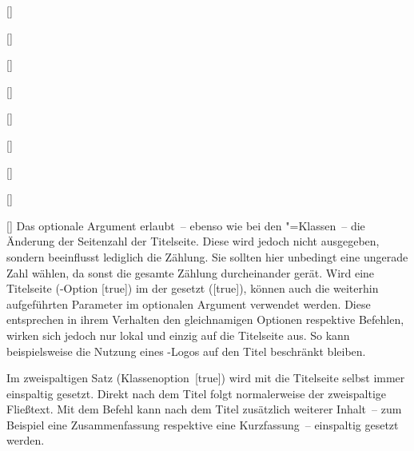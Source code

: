 \begin{Declaration*}{}
\begin{Declaration*}{}
\begin{Declaration*}{}
\begin{Declaration}
\begin{Declaration}[v2.02]{%
  []%
}
\begin{Declaration}[v2.02]{[\PSet]}{%
}
\begin{Declaration}[v2.03]{[\PSet]}{%
}
\begin{Declaration}[v2.03]{[\PSet]}{%
}
\begin{Declaration}[v2.03]{%
  []%
}{}
\begin{Declaration}[v2.03]{%
  []
}{}
\begin{Declaration}[v2.03]{[\PSet]}{%
}
\begin{Declaration}[v2.03]{[\PSet]}{%
}
\begin{Declaration}[v2.03]{[\PSet]}{%
}
Das optionale Argument erlaubt~-- ebenso wie bei den \KOMAScript"=Klassen~-- 
die Änderung der Seitenzahl der Titelseite. Diese wird jedoch nicht ausgegeben, 
sondern beeinflusst lediglich die Zählung. Sie sollten hier unbedingt eine 
ungerade Zahl wählen, da sonst die gesamte Zählung durcheinander gerät. 
Wird eine Titelseite (\KOMAScript-Option [true]) im \CD der 
\TnUD gesetzt ([true]), können auch die weiterhin aufgeführten 
Parameter im optionalen Argument verwendet werden. Diese entsprechen in ihrem 
Verhalten den gleichnamigen Optionen respektive Befehlen, wirken sich jedoch 
nur lokal und einzig auf die Titelseite aus. So kann beispielsweise die Nutzung 
eines \DDC-Logos auf den Titel beschränkt bleiben.
\end{Declaration}
\end{Declaration}
\end{Declaration}
\end{Declaration}
\end{Declaration}
\end{Declaration}
\end{Declaration}
\end{Declaration}
\end{Declaration}
\end{Declaration}

\begin{Declaration}{%
}
\printdeclarationlist%
%
%
%
Im zweispaltigen Satz (Klassenoption~[true]) wird mit 
 die Titelseite selbst immer einspaltig gesetzt. Direkt nach 
dem Titel folgt normalerweise der zweispaltige Fließtext. Mit dem Befehl 
 kann nach dem Titel zusätzlich weiterer Inhalt~-- 
zum Beispiel eine Zusammenfassung respektive eine Kurzfassung~-- einspaltig 
gesetzt werden.


\end{Declaration}
\end{Declaration*}
\end{Declaration*}
\end{Declaration*}
